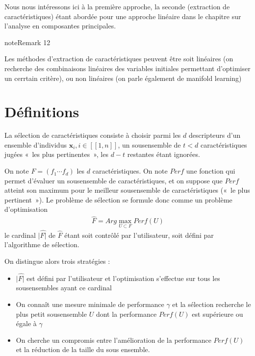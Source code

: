 \documentclass[letterpaper,10pt,french]{sphinxmanual}
\begin{document}
\sphinxAtStartPar
Nous nous intéressons ici à la première approche, la seconde (extraction de caractéristiques) étant abordée pour une approche linéaire dans le chapitre sur l’analyse en composantes principales.
\label{selection:remark-0}
\begin{sphinxadmonition}{note}{Remark 12}



\sphinxAtStartPar
Les méthodes d’extraction de caractéristiques peuvent être soit linéaires (on recherche des combinaisons linéaires des variables initiales  permettant d’optimiser un cerrtain critère), ou non linéaires (on parle également de manifold learning)
\end{sphinxadmonition}


\section{Définitions}
\label{\detokenize{selection:definitions}}
\sphinxAtStartPar
La sélection de caractéristiques consiste à choisir parmi les \(d\) descripteurs d’un ensemble d’individus \(\mathbf x_i,i\in[\![1,n]\!]\), un sous\sphinxhyphen{}ensemble de  \(t<d\)  caractéristiques jugées « les plus pertinentes », les \(d-t\) restantes étant ignorées.

\sphinxAtStartPar
On note \(F = \left (f_1\cdots f_d\right )\) les \(d\) caractéristiques.  On note \(Perf\) une fonction qui permet d’évaluer un sous\sphinxhyphen{}ensemble de caractéristiques, et on suppose que \(Perf\) atteint son maximum pour le meilleur sous\sphinxhyphen{}ensemble de caractéristiques (« le plus pertinent »). Le problème de sélection se formule donc comme un problème d’optimisation
\begin{equation*}
\begin{split}\hat{F} = Arg\displaystyle\max_{U\subset F} Perf(U)\end{split}
\end{equation*}
\sphinxAtStartPar
le cardinal \(|\hat{F|}\) de \(\hat{F}\) étant soit contrôlé par l’utilisateur, soit défini par l’algorithme de sélection.

\sphinxAtStartPar
On distingue alors trois stratégies :
\begin{itemize}
\item {} 
\sphinxAtStartPar
\(|\hat{F|}\) est défini par l’utilisateur et l’optimisation s’effectue sur tous les sous\sphinxhyphen{}ensembles ayant ce cardinal

\item {} 
\sphinxAtStartPar
On connaît une mesure minimale de performance \(\gamma\)  et la sélection recherche le plus petit sous\sphinxhyphen{}ensemble \(U\) dont la performance \(Perf(U)\) est supérieure ou égale à \(\gamma\)

\item {} 
\sphinxAtStartPar
On cherche un compromis entre l’amélioration de la performance \(Perf(U)\) et la réduction de la taille du sous ensemble.

\end{itemize}
\end{document}
